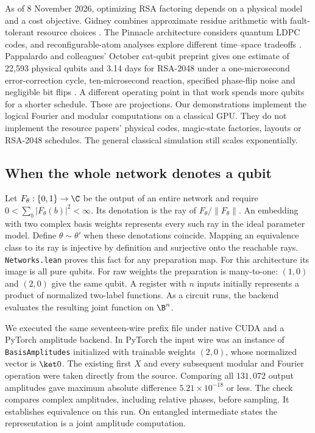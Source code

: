 As of 8 November 2026, optimizing RSA factoring depends on a physical model and a cost objective. Gidney combines approximate residue arithmetic with fault-tolerant resource choices \cite{gidney}. The Pinnacle architecture considers quantum LDPC codes, and reconfigurable-atom analyses explore different time--space tradeoffs \cite{pinnacle,oratomic}. Pappalardo and colleagues' October cat-qubit preprint gives one estimate of 22,593 physical qubits and 3.14 days for RSA-2048 under a one-microsecond error-correction cycle, ten-microsecond reaction, specified phase-flip noise and negligible bit flips \cite{catshor}. A different operating point in that work spends more qubits for a shorter schedule. These are projections. Our demonstrations implement the logical Fourier and modular computations on a classical GPU. They do not implement the resource papers' physical codes, magic-state factories, layouts or RSA-2048 schedules. The general classical simulation still scales exponentially.

\subsection{When the whole network denotes a qubit}
Let $F_\theta:\{0,1\}\to\C$ be the output of an entire network and require $0<\sum_b|F_\theta(b)|^2<\infty$. Its denotation is the ray of $F_\theta/\|F_\theta\|$. An embedding with two complex basis weights represents every such ray in the ideal parameter model. Define $\theta\sim\theta'$ when these denotations coincide. Mapping an equivalence class to its ray is injective by definition and surjective onto the reachable rays. \texttt{Networks.lean} proves this fact for any preparation map. For this architecture its image is all pure qubits. For raw weights the preparation is many-to-one: $(1,0)$ and $(2,0)$ give the same qubit. A register with $n$ inputs initially represents a product of normalized two-label functions. As a circuit runs, the backend evaluates the resulting joint function on $\B^n$.

We executed the same seventeen-wire prefix file under native CUDA and a PyTorch amplitude backend. In PyTorch the input wire was an instance of \texttt{BasisAmplitudes} initialized with trainable weights $(2,0)$, whose normalized vector is $\ket0$. The existing first $X$ and every subsequent modular and Fourier operation were taken directly from the source. Comparing all $131{,}072$ output amplitudes gave maximum absolute difference $5.21\times10^{-18}$ or less. The check compares complex amplitudes, including relative phases, before sampling. It establishes equivalence on this run. On entangled intermediate states the representation is a joint amplitude computation.

